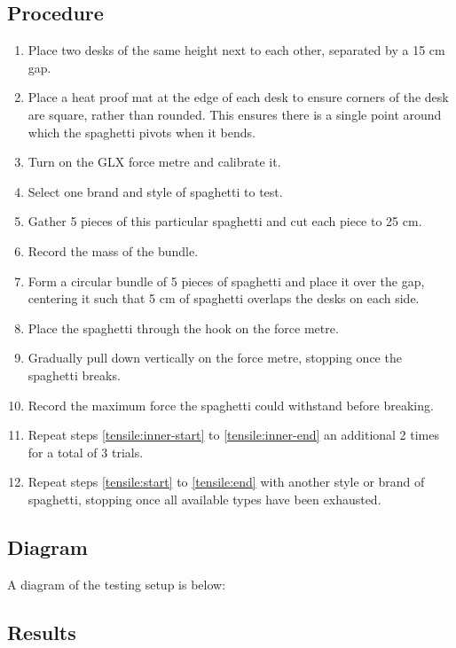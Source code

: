 \documentclass[a4paper,11pt]{article}
\begin{document}
\subsection{Procedure}

\begin{enumerate}
\item Place two desks of the same height next to each other, separated by a 15
	cm gap.
\item Place a heat proof mat at the edge of each desk to ensure corners of the
	desk are square, rather than rounded. This ensures there is a single
	point around which the spaghetti pivots when it bends.
\item Turn on the GLX force metre and calibrate it.
\item \label{tensile:start} Select one brand and style of spaghetti to test.
\item \label{tensile:inner-start} Gather 5 pieces of this particular spaghetti
	and cut each piece to 25 cm.
\item Record the mass of the bundle.
\item Form a circular bundle of 5 pieces of spaghetti and place it over the gap,
	centering it such that 5 cm of spaghetti overlaps the desks on each side.
\item Place the spaghetti through the hook on the force metre.
\item Gradually pull down vertically on the force metre, stopping once the
	spaghetti breaks.
\item \label{tensile:inner-end} Record the maximum force the spaghetti could
	withstand before breaking.
\item \label{tensile:end} Repeat steps \ref{tensile:inner-start} to
	\ref{tensile:inner-end} an additional 2 times for a total of 3 trials.
\item Repeat steps \ref{tensile:start} to \ref{tensile:end} with another
	style or brand of spaghetti, stopping once all available types have been
	exhausted.
\end{enumerate}


\subsection{Diagram}

A diagram of the testing setup is below:

\vspace{5cm}


\subsection{Results}
\end{document}
